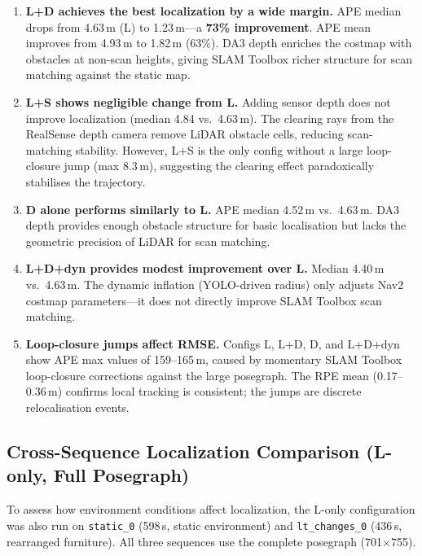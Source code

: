 \documentclass[11pt,a4paper]{article}
\begin{document}
\begin{enumerate}[nosep]
  \item \textbf{L+D achieves the best localization by a wide margin.}
    APE median drops from 4.63\,m (L) to 1.23\,m---a \textbf{73\%
    improvement}.  APE mean improves from 4.93\,m to 1.82\,m (63\%).
    DA3 depth enriches the costmap with obstacles at non-scan heights,
    giving SLAM Toolbox richer structure for scan matching against the
    static map.

  \item \textbf{L+S shows negligible change from L.}  Adding sensor
    depth does not improve localization (median 4.84 vs.\ 4.63\,m).
    The clearing rays from the RealSense depth camera remove LiDAR
    obstacle cells, reducing scan-matching stability.  However, L+S is
    the only config without a large loop-closure jump (max 8.3\,m),
    suggesting the clearing effect paradoxically stabilises the
    trajectory.

  \item \textbf{D alone performs similarly to L.}  APE median 4.52\,m
    vs.\ 4.63\,m.  DA3 depth provides enough obstacle structure for
    basic localisation but lacks the geometric precision of LiDAR for
    scan matching.

  \item \textbf{L+D+dyn provides modest improvement over L.}  Median
    4.40\,m vs.\ 4.63\,m.  The dynamic inflation (YOLO-driven radius)
    only adjusts Nav2 costmap parameters---it does not directly improve
    SLAM Toolbox scan matching.

  \item \textbf{Loop-closure jumps affect RMSE.}  Configs L, L+D, D,
    and L+D+dyn show APE max values of 159--165\,m, caused by
    momentary SLAM Toolbox loop-closure corrections against the large
    posegraph.  The RPE mean (0.17--0.36\,m) confirms local tracking
    is consistent; the jumps are discrete relocalisation events.
\end{enumerate}

\subsection{Cross-Sequence Localization Comparison (L-only, Full Posegraph)}

To assess how environment conditions affect localization, the L-only
configuration was also run on \texttt{static\_0} (598\,s, static
environment) and \texttt{lt\_changes\_0} (436\,s, rearranged furniture).
All three sequences use the complete posegraph (701$\times$755).
\end{document}
